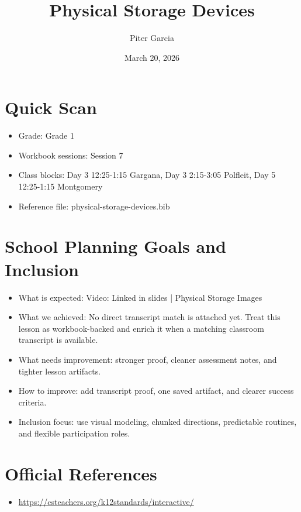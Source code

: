 \documentclass[11pt]{article}
\title{Physical Storage Devices}
\author{Piter Garcia}
\date{March 20, 2026}
\begin{document}
\maketitle
\section*{Quick Scan}
\begin{itemize}[leftmargin=*]
\item Grade: Grade 1
\item Workbook sessions: Session 7
\item Class blocks: Day 3 12:25-1:15 Gargana, Day 3 2:15-3:05 Polfleit, Day 5 12:25-1:15 Montgomery
\item Reference file: physical-storage-devices.bib
\end{itemize}
\section*{School Planning Goals and Inclusion}
\begin{itemize}[leftmargin=*]
\item What is expected: Video: Linked in slides | Physical Storage Images
\item What we achieved: No direct transcript match is attached yet. Treat this lesson as workbook-backed and enrich it when a matching classroom transcript is available.
\item What needs improvement: stronger proof, cleaner assessment notes, and tighter lesson artifacts.
\item How to improve: add transcript proof, one saved artifact, and clearer success criteria.
\item Inclusion focus: use visual modeling, chunked directions, predictable routines, and flexible participation roles.
\end{itemize}
\section*{Official References}
\begin{itemize}[leftmargin=*]
\item \url{https://csteachers.org/k12standards/interactive/}

\end{itemize}
\end{document}
